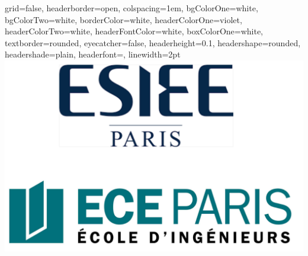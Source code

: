 \documentclass[a0paper,portrait]{baposter}
\begin{document}

\begin{poster}{
    grid=false,
    headerborder=open,           %
    colspacing=1em,              %
    bgColorOne=white,            %
    bgColorTwo=white,            %
    borderColor=white,       %
    headerColorOne=violet,   %
    headerColorTwo=white,   %
    headerFontColor=white,       %
    boxColorOne=white,           %
    textborder=rounded,          %
    eyecatcher=false,            %
    headerheight=0.1\textheight,%
    headershape=rounded,         %
    headershade=plain,
    headerfont=\Large\textsf,    %
    linewidth=2pt                %
}{
    \includegraphics[scale=.3]{esiee}
}
\end{poster}
\end{document}
